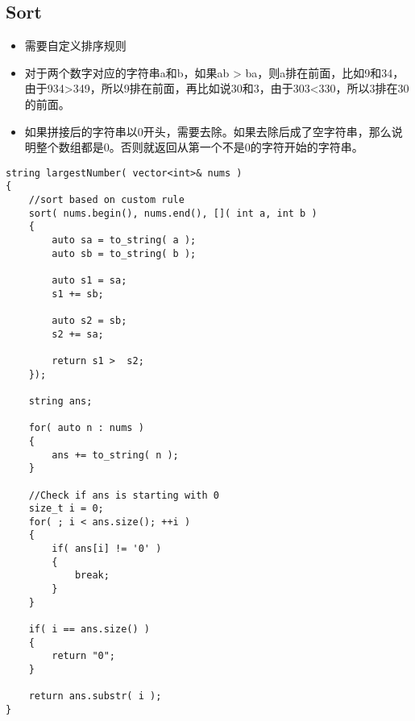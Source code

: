 \subsection{Sort}
\begin{CJK*}{UTF8}{gbsn}
\begin{itemize}
\item 需要自定义排序规则
\item 对于两个数字对应的字符串a和b，如果ab > ba，则a排在前面，比如9和34，由于934>349，所以9排在前面，再比如说30和3，由于303<330，所以3排在30的前面。
\item 如果拼接后的字符串以0开头，需要去除。如果去除后成了空字符串，那么说明整个数组都是0。否则就返回从第一个不是0的字符开始的字符串。 
\end{itemize}
\end{CJK*}
\setcounter{lstlisting}{0}
\begin{lstlisting}[style=customc, caption={Sort Based On Custom Rule[]}]
string largestNumber( vector<int>& nums )
{
	//sort based on custom rule
    sort( nums.begin(), nums.end(), []( int a, int b )
    {
        auto sa = to_string( a );
        auto sb = to_string( b );

        auto s1 = sa;
        s1 += sb;

        auto s2 = sb;
        s2 += sa;

        return s1 >  s2;
    });

    string ans;

    for( auto n : nums )
    {
        ans += to_string( n );
    }

	//Check if ans is starting with 0
    size_t i = 0;
    for( ; i < ans.size(); ++i )
    {
        if( ans[i] != '0' )
        {
            break;
        }
    }

    if( i == ans.size() )
    {
        return "0";
    }

    return ans.substr( i );
}
\end{lstlisting}